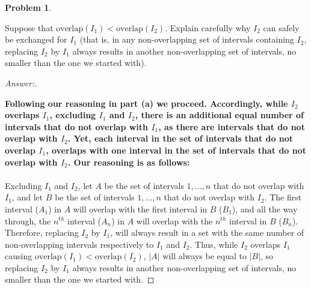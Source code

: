 \documentclass[11pt]{article}
\theoremstyle{definition}
\theoremstyle{definition}
\newtheorem{required}{Problem}
\theoremstyle{definition}
\begin{document}
\begin{required}
\begin{enumerate}[label=(\alph*)]
\vskip 50pt
\item Suppose that $\text{overlap}(I_{1}) < \text{overlap}(I_{2})$. Explain carefully why $I_{2}$ can safely be exchanged for $I_{1}$ (that is, in any non-overlapping set of intervals containing $I_2$, replacing $I_2$ by $I_1$ always results in another non-overlapping set of intervals, no smaller than the one we started with).
\begin{proof}[Answer:] \
\item \textbf{Following our reasoning in part (a) we proceed. Accordingly, while $I_{2}$ overlaps $I_{1}$, excluding $I_{1}$ and $I_{2}$, there is an additional equal number of intervals that do not overlap with $I_{1}$, as there are intervals that do not overlap with $I_{2}$. Yet, each interval in the set of intervals that do not overlap $I_{1}$, overlaps with one interval in the set of intervals that do not overlap with $I_{2}$. Our reasoning is as follows:} \\ \\
Excluding $I_{1}$ and $I_{2}$, let $A$ be the set of intervals ${1,...,n}$ that do not overlap with $I_{1}$, and let $B$ be the set of intervals ${1,...,n}$ that do not overlap with $I_{2}$. The first interval ($A_{1}$) in $A$ will overlap with the first interval in $B$ ($B_{1}$), and all the way through, the $n^{th}$ interval ($A_{n}$) in $A$ will overlap with the $n^{th}$ interval in $B$ ($B_{n}$). Therefore, replacing $I_{2}$ by $I_{1}$, will always result in a set with the same number of non-overlapping intervals respectively to $I_{1}$ and $I_{2}$. Thus, while $I_{2}$ overlaps $I_{1}$ causing $\text{overlap}(I_{1}) < \text{overlap}(I_{2})$, $|A|$ will always be equal to $|B|$, so replacing $I_2$ by $I_1$ always results in another non-overlapping set of intervals, no smaller than the one we started with.
\end{proof}
\end{enumerate}
\end{required}



\end{document}
